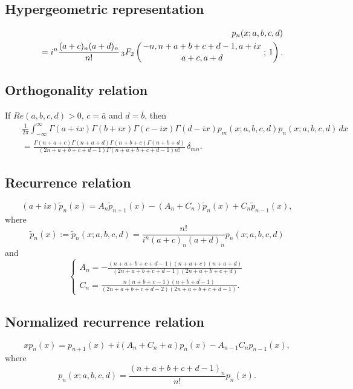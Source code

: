 \documentclass[envcountchap,graybox]{svmono}
\newcommand{\hyp}[5]{\mbox{}_{#1}{F}_{#2}
\left(\genfrac{}{}{0pt}{}{#3}{#4}\,;\,#5\right)}
\renewcommand{\Gamma}{\varGamma}
\newcommand{\hyp}[5]{\,\mbox{}_{#1}F_{#2}\!\left(
  \genfrac{}{}{0pt}{}{#3}{#4};#5\right)}
\begin{document}
\par\setcounter{equation}{0}

\subsection*{Hypergeometric representation}
\begin{eqnarray}
\label{DefContHahn}
& &p_n(x;a,b,c,d)\nonumber\\
& &{}=i^n\frac{(a+c)_n(a+d)_n}{n!}\,\hyp{3}{2}{-n,n+a+b+c+d-1,a+ix}{a+c,a+d}{1}.
\end{eqnarray}

\subsection*{Orthogonality relation}
If $Re(a,b,c,d)>0$, $c=\bar{a}$ and $d=\bar{b}$, then
\begin{eqnarray}
\label{OrtContHahn}
& &\frac{1}{2\pi}\int_{-\infty}^{\infty}\Gamma(a+ix)\Gamma(b+ix)\Gamma(c-ix)\Gamma(d-ix)
p_m(x;a,b,c,d)p_n(x;a,b,c,d)\,dx\nonumber\\
& &{}=\frac{\Gamma(n+a+c)\Gamma(n+a+d)\Gamma(n+b+c)\Gamma(n+b+d)}
{(2n+a+b+c+d-1)\Gamma(n+a+b+c+d-1)n!}\,\delta_{mn}.
\end{eqnarray}

\subsection*{Recurrence relation}
\begin{equation}
\label{RecContHahn}
(a+ix)\tilde{p}_n(x)=A_n\tilde{p}_{n+1}(x)-\left(A_n+C_n\right)\tilde{p}_n(x)+C_n\tilde{p}_{n-1}(x),
\end{equation}
where
$$\tilde{p}_n(x):=\tilde{p}_n(x;a,b,c,d)=\frac{n!}{i^n(a+c)_n(a+d)_n}p_n(x;a,b,c,d)$$
and
$$\left\{\begin{array}{l}
\displaystyle A_n=-\frac{(n+a+b+c+d-1)(n+a+c)(n+a+d)}{(2n+a+b+c+d-1)(2n+a+b+c+d)}\\[5mm]
\displaystyle C_n=\frac{n(n+b+c-1)(n+b+d-1)}{(2n+a+b+c+d-2)(2n+a+b+c+d-1)}.
\end{array}\right.$$

\subsection*{Normalized recurrence relation}
\begin{equation}
\label{NormRecContHahn}
xp_n(x)=p_{n+1}(x)+i(A_n+C_n+a)p_n(x)-A_{n-1}C_np_{n-1}(x),
\end{equation}
where
$$p_n(x;a,b,c,d)=\frac{(n+a+b+c+d-1)_n}{n!}p_n(x).$$
\end{document}
